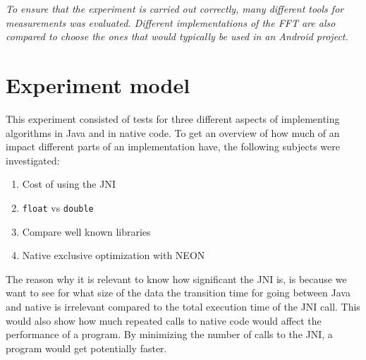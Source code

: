 \textit{To ensure that the experiment is carried out correctly, many different tools for measurements was evaluated. Different implementations of the FFT are also compared to choose the ones that would typically be used in an Android project.}

\section{Experiment model}

This experiment consisted of tests for three different aspects of implementing algorithms in Java and in native code. To get an overview of how much of an impact different parts of an implementation have, the following subjects were investigated:

\begin{enumerate}
    \item Cost of using the JNI
    \item \texttt{float} vs \texttt{double}
    \item Compare well known libraries
    \item Native exclusive optimization with NEON
\end{enumerate}

The reason why it is relevant to know how significant the JNI is, is because we want to see for what size of the data the transition time for going between Java and native is irrelevant compared to the total execution time of the JNI call. This would also show how much repeated calls to native code would affect the performance of a program. By minimizing the number of calls to the JNI, a program would get potentially faster.

